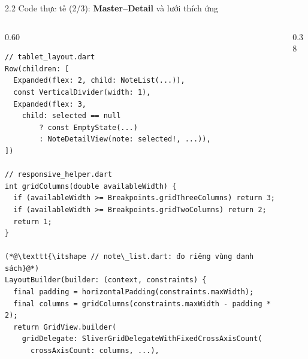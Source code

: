 \documentclass[aspectratio=169,10pt]{beamer}
\newcommand{\api}[1]{\texttt{\bfseries #1}}   %
\begin{document}
\begin{frame}[fragile]{2.2 Code thực tế (2/3): \textbf{Master--Detail} và lưới thích ứng}
  \begin{columns}[T]
    \begin{column}{0.60\textwidth}
\begin{lstlisting}[basicstyle=\ttfamily\fontsize{6.0}{7.0}\selectfont]
// tablet_layout.dart
Row(children: [
  Expanded(flex: 2, child: NoteList(...)),
  const VerticalDivider(width: 1),
  Expanded(flex: 3,
    child: selected == null
        ? const EmptyState(...)
        : NoteDetailView(note: selected!, ...)),
])

// responsive_helper.dart
int gridColumns(double availableWidth) {
  if (availableWidth >= Breakpoints.gridThreeColumns) return 3;
  if (availableWidth >= Breakpoints.gridTwoColumns) return 2;
  return 1;
}

(*@\texttt{\itshape // note\_list.dart: đo riêng vùng danh sách}@*)
LayoutBuilder(builder: (context, constraints) {
  final padding = horizontalPadding(constraints.maxWidth);
  final columns = gridColumns(constraints.maxWidth - padding * 2);
  return GridView.builder(
    gridDelegate: SliverGridDelegateWithFixedCrossAxisCount(
      crossAxisCount: columns, ...),
\end{lstlisting}
    \end{column}
    \begin{column}{0.38\textwidth}
      \footnotesize
    \end{column}
  \end{columns}
\end{frame}
\end{document}
